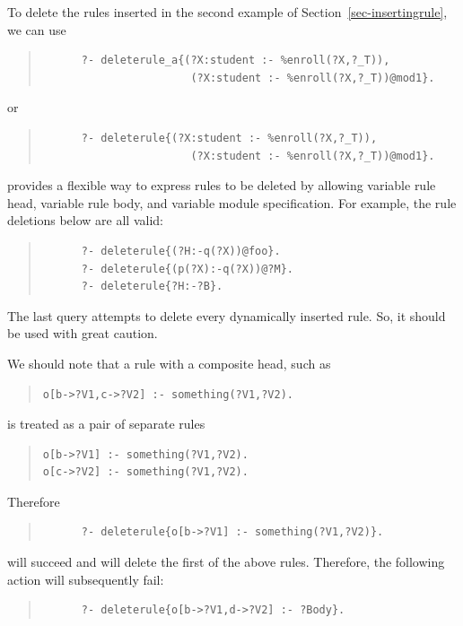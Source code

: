 \documentclass[11pt]{article}
\newcommand{\ERGO}{\mbox{\smaller{\ensuremath{\cal{E}}\smaller{{\sc{RGO}}}}}\xspace}
\newcommand{\FLSYSTEM}{\ERGO}
\begin{document}
To delete the rules inserted in the second example of
Section~\ref{sec-insertingrule}, we can use
\begin{quote}
\begin{verbatim}
      ?- deleterule_a{(?X:student :- %enroll(?X,?_T)),
                       (?X:student :- %enroll(?X,?_T))@mod1}.
\end{verbatim}
\end{quote}
or
\begin{quote}
\begin{verbatim}
      ?- deleterule{(?X:student :- %enroll(?X,?_T)),
                       (?X:student :- %enroll(?X,?_T))@mod1}.
\end{verbatim}
\end{quote}

\FLSYSTEM provides a flexible way to express rules to be deleted by
allowing variable rule head, variable rule body, and variable module
specification. For example, the rule deletions below are all valid:
\begin{quote}
\begin{verbatim}
      ?- deleterule{(?H:-q(?X))@foo}.
      ?- deleterule{(p(?X):-q(?X))@?M}.
      ?- deleterule{?H:-?B}.
\end{verbatim}
\end{quote}
The last query attempts to delete every dynamically inserted rule. So, it
should be used with great caution.

We should note that a rule with a composite head, such as 
\begin{quote}
   \begin{verbatim}
o[b->?V1,c->?V2] :- something(?V1,?V2).     
   \end{verbatim}
\end{quote}
is treated as a pair of separate rules
\begin{quote}
\begin{verbatim}
o[b->?V1] :- something(?V1,?V2).     
o[c->?V2] :- something(?V1,?V2).     
\end{verbatim}
\end{quote}
Therefore
\begin{quote}
\begin{verbatim}
      ?- deleterule{o[b->?V1] :- something(?V1,?V2)}.
\end{verbatim}
\end{quote}
will succeed and will delete the first of the above rules.
Therefore, the following action will subsequently fail:
\begin{quote}
\begin{verbatim}
      ?- deleterule{o[b->?V1,d->?V2] :- ?Body}.
\end{verbatim}
\end{quote}
\end{document}

